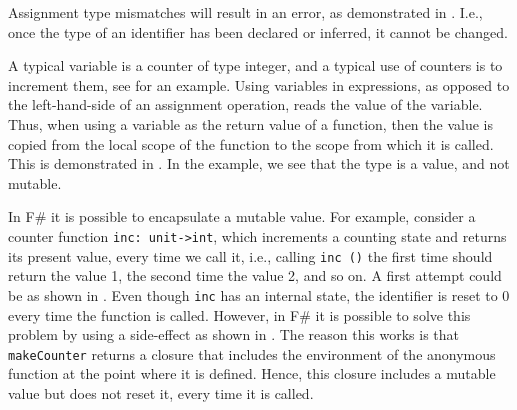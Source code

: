 \documentclass[fsharpNotes.tex]{subfiles}
\begin{document}
%
%
%

Assignment type mismatches will result in an error, as demonstrated in . 
%
%
I.e., once the type of an identifier has been declared or inferred, it cannot be changed.

A typical variable is a counter of type integer, and a typical use of counters is to increment them, see  for an example.
%
%
Using variables in expressions, as opposed to the left-hand-side of an assignment operation, reads the value of the variable. Thus, when using a variable as the return value of a function, then the value is copied from the local scope of the function to the scope from which it is called. This is demonstrated in .
%
%
In the example,  we see that the type is a value, and not mutable.

In F\# it is possible to encapsulate a mutable value. For example, consider a counter function \lstinline{inc: unit->int}, which increments a counting state and returns its present value, every time we call it, i.e., calling \lstinline{inc ()} the first time should return the value 1, the second time the value 2, and so on. A first attempt could be as shown in . 
%
%
Even though \lstinline{inc} has an internal state, the identifier  is reset to 0 every time the function is called. However, in F\# it is possible to solve this problem by using a side-effect as shown in .
%
%
The reason this works is that \lstinline{makeCounter} returns a closure that includes the environment of the anonymous function at the point where it is defined. Hence, this closure includes a mutable value but does not reset it, every time it is called.
\end{document}
